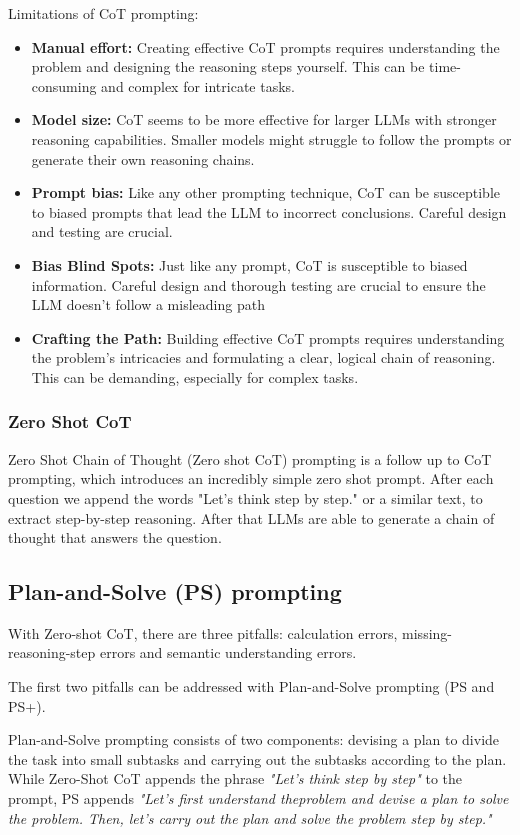 \documentclass[fleqn,moreauthors,10pt]{ds_report}
\begin{document}
Limitations of CoT prompting:
\begin{itemize}
    \item \textbf{Manual effort:} Creating effective CoT prompts requires understanding the problem and designing the reasoning steps yourself. This can be time-consuming and complex for intricate tasks.
    \item \textbf{Model size:} CoT seems to be more effective for larger LLMs with stronger reasoning capabilities. Smaller models might struggle to follow the prompts or generate their own reasoning chains.
    \item \textbf{Prompt bias:} Like any other prompting technique, CoT can be susceptible to biased prompts that lead the LLM to incorrect conclusions. Careful design and testing are crucial.
    \item \textbf{Bias Blind Spots:} Just like any prompt, CoT is susceptible to biased information. Careful design and thorough testing are crucial to ensure the LLM doesn’t follow a misleading path
    \item \textbf{Crafting the Path:} Building effective CoT prompts requires understanding the problem’s intricacies and formulating a clear, logical chain of reasoning. This can be demanding, especially for complex tasks. \cite{cot} 

\end{itemize}
\subsubsection*{Zero Shot CoT}
 Zero Shot Chain of Thought (Zero shot CoT) prompting is a follow up to CoT prompting, which introduces an incredibly simple zero shot prompt. After each question we append the words "Let's think step by step."  or a similar text, to extract step-by-step reasoning. After that LLMs are able to generate a chain of thought that answers the question. \cite{Zero} 

\subsection*{Plan-and-Solve (PS) prompting}
With Zero-shot CoT, there are three pitfalls: calculation errors, missing-reasoning-step errors and semantic understanding errors. 

The first two pitfalls can be addressed with Plan-and-Solve prompting (PS and PS+).
\newline

Plan-and-Solve prompting consists of two components: devising a plan to divide the task into small subtasks and carrying out the subtasks according to the plan. While Zero-Shot CoT appends the phrase \textit{"Let's think step by step"} to the prompt, PS appends \textit{"Let’s first understand theproblem and devise a plan to solve the problem. Then, let’s carry out the plan and solve the problem step by step." }
\newline
\end{document}
